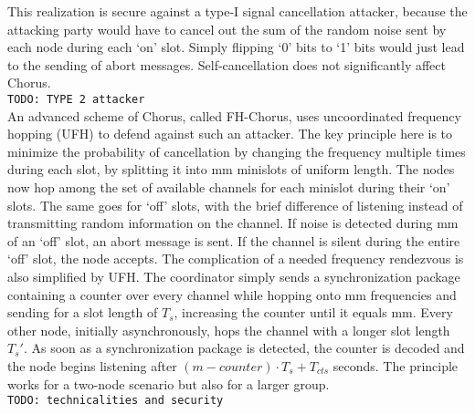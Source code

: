\documentclass[conference]{IEEEtran}
\begin{document}
This realization is secure against a type-I signal cancellation attacker, because the attacking party would have to cancel out the sum of the random noise sent by each node during each `on' slot. Simply flipping `0' bits to `1' bits would just lead to the sending of abort messages. Self-cancellation does not significantly affect Chorus. \\
\texttt{TODO: TYPE 2 attacker} \\
An advanced scheme of Chorus, called FH-Chorus, uses uncoordinated frequency hopping (UFH) to defend against such an attacker. The key principle here is to minimize the probability of cancellation by changing the frequency multiple times during each slot, by splitting it into mm minislots of uniform length.
The nodes now hop among the set of available channels for each minislot during their `on' slots. The same goes for `off' slots, with the brief difference of listening instead of transmitting random information on the channel. If noise is detected during mm of an `off' slot, an abort message is sent. If the channel is silent during the entire `off' slot, the node accepts.
The complication of a needed frequency rendezvous is also simplified by UFH. The coordinator simply sends a synchronization package containing a counter over every channel while hopping onto mm frequencies and sending for a slot length of $T_s$, increasing the counter until it equals mm. Every other node, initially
asynchronously, hops the channel with a longer slot length $T_s'$. As soon as a synchronization package is detected, the counter is decoded and the node begins listening after $(m-counter) \cdot T_s + T_{cts}$ seconds.
The principle works for a two-node scenario but also for a larger group. \\
\texttt{TODO: technicalities and security}
\end{document}
